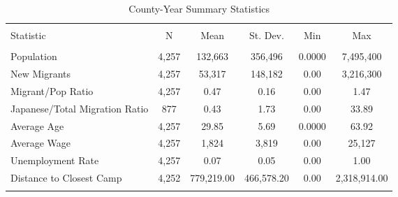 
\begin{table}[!htbp] \centering 
  \caption{County-Year Summary Statistics} 
  \label{ctysumstats} 
\begin{tabular}{@{\extracolsep{5pt}}lccccc} 
\\[-1.8ex]\hline 
\hline \\[-1.8ex] 
Statistic & \multicolumn{1}{c}{N} & \multicolumn{1}{c}{Mean} & \multicolumn{1}{c}{St. Dev.} & \multicolumn{1}{c}{Min} & \multicolumn{1}{c}{Max} \\ 
\hline \\[-1.8ex] 
Population & 4,257 & 132,663 & 356,496 & 0.0000 & 7,495,400\\ 
New Migrants & 4,257 & 53,317 & 148,182 & 0.00 & 3,216,300\\ 
Migrant/Pop Ratio & 4,257 & 0.47 & 0.16 & 0.00 & 1.47 \\ 
Japanese/Total Migration Ratio & 877 & 0.43 & 1.73 & 0.00 & 33.89 \\ 
Average Age & 4,257 & 29.85 & 5.69 & 0.0000 & 63.92 \\ 
Average Wage & 4,257 & 1,824 & 3,819 & 0.00 & 25,127\\ 
Unemployment Rate & 4,257 & 0.07 & 0.05 & 0.00 & 1.00 \\ 
Distance to Closest Camp & 4,252 & 779,219.00 & 466,578.20 & 0.00 & 2,318,914.00 \\ 
\hline \\[-1.8ex] 
\end{tabular} 
\end{table} 
